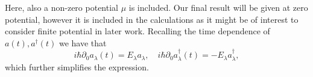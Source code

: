 Here, also a non-zero potential $\mu $ is included.
Our final result will be given at zero potential, however it is included in the calculations as it might be of interest to consider finite potential in later work.
Recalling the time dependence of $a(t), a^{\dagger}(t)$ we have that
\[
  i\hbar \partial _0 a_{\lambda }(t) = E_{\lambda }a_{\lambda },
  \quad
  i\hbar \partial _0 a^{\dagger}_{\lambda }(t) = -E_{\lambda }a^{\dagger}_{\lambda },
\]
which further simplifies the expression.

\begin{comment}
  The stress-energy tensor of the massless QED
  \begin{equation}
    \label{eq:42}
    \mathcal{L} = -\frac{1}{4} F^{\mu \nu }F_{\mu \nu } + \overline{\psi} i \slashed{D} \psi
  \end{equation}
  is given by~\cite{chernodubGenerationNernstCurrent2018}
  \begin{equation}
    T^{\mu \nu } = -F^{\mu \nu } F_{\mu \nu } + \frac{1}{4} \eta ^{\mu \nu } F_{\alpha \beta } F^{\alpha \beta } + \frac{i}{2} \overline{\psi}
    \left( \gamma ^{\mu } D^{\nu } + \gamma ^{\nu } D^{\mu } \right) \psi
    - \eta ^{\mu \nu } \overline{\psi} i \slashed{D} \psi .
  \end{equation}
  Specializing to the Weyl Hamiltonian we may drop the terms originating with the $F$ field self energy, and also we will consider only one Weyl spinor part of the Dirac four spinor.
  Thus, the stress-energy tensor is given by
  \begin{equation}
    T^{\mu \nu } = \frac{i}{2} \psi ^{\dagger} \left( \sigma ^{\mu } D^{\nu } + \sigma ^{\nu } D^{\mu } \right) \psi  - \eta ^{\mu \nu } \psi ^{\dagger} i \sigma ^{\mu } D_{\mu } \psi ,
    \label{eq:43}
  \end{equation}
  where $\psi $ is to be understood as the solutions found above, $D_{\mu }=\partial _{\mu }  - i e A_{\mu }$ is the covariant derivative, and $\sigma ^{\mu } = (I, \sigma ^i)$
  In our calculations we will require the $T^{0y}$ component, which we will now find.


\end{comment}
